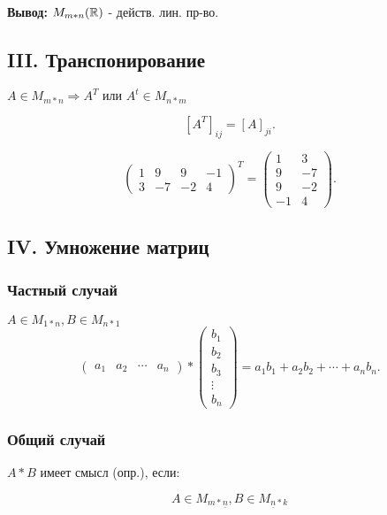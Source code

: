\textbf{Вывод:} $M_{m*n}(\mathbb{R})$ - действ. лин. пр-во.

\subsection{III. Транспонирование}
$A \in M_{m * n} \Rightarrow A^{T} \text{ или } A^{t} \in M_{n * m}$

\begin{definition}
 \[
     [A^{T}]_{ij} = [A]_{ji}
 .\] 
\end{definition}

\begin{example}
\[
    \begin{pmatrix} 1 & 9 & 9 & -1 \\ 3 & -7 & -2 & 4 \end{pmatrix}^{T} = \begin{pmatrix} 1 & 3 \\ 9 & -7 \\ 9 & -2 \\ -1 & 4 \end{pmatrix} 
.\] 
\end{example}

\subsection{IV. Умножение матриц}

\subsubsection{Частный случай}
$A \in M_{1*n}, B \in M_{n * 1}$ 
\[
    \begin{pmatrix} a_1 & a_2 & \cdots & a_n \end{pmatrix} * \begin{pmatrix} b_1 \\ b_2 \\ b_3 \\ \vdots \\ b_n \end{pmatrix} = a_1 b_1 + a_2 b_2 + \cdots + a_n b_n
.\] 

\subsubsection{Общий случай}

$A * B$ имеет смысл (опр.), если:

\[
    A \in M_{m * \underline{n}}, B \in M_{\underline{n} * k}
\]

